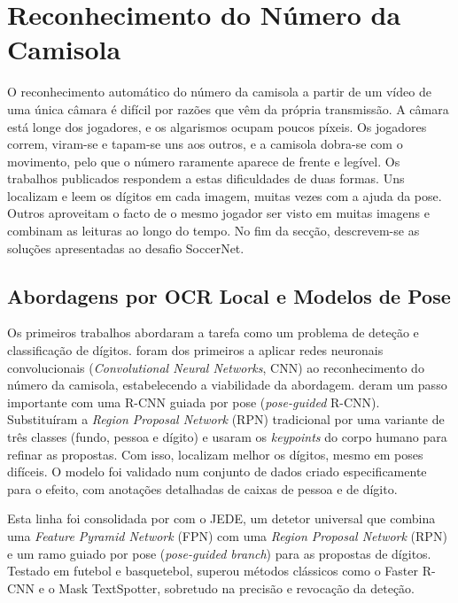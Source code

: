 \section{Reconhecimento do Número da Camisola}

O reconhecimento automático do número da camisola a partir de um vídeo de uma única câmara é difícil por razões que vêm da própria transmissão. A câmara está longe dos jogadores, e os algarismos ocupam poucos píxeis. Os jogadores correm, viram-se e tapam-se uns aos outros, e a camisola dobra-se com o movimento, pelo que o número raramente aparece de frente e legível. Os trabalhos publicados respondem a estas dificuldades de duas formas. Uns localizam e leem os dígitos em cada imagem, muitas vezes com a ajuda da pose. Outros aproveitam o facto de o mesmo jogador ser visto em muitas imagens e combinam as leituras ao longo do tempo. No fim da secção, descrevem-se as soluções apresentadas ao desafio SoccerNet.

\subsection{Abordagens por OCR Local e Modelos de Pose}

Os primeiros trabalhos abordaram a tarefa como um problema de deteção e classificação de dígitos. \citet{gerke2015soccer} foram dos primeiros a aplicar redes neuronais convolucionais (\emph{Convolutional Neural Networks}, CNN) ao reconhecimento do número da camisola, estabelecendo a viabilidade da abordagem. \citet{liu2019poseguided} deram um passo importante com uma R-CNN guiada por pose (\emph{pose-guided} R-CNN). Substituíram a \emph{Region Proposal Network} (RPN) tradicional por uma variante de três classes (fundo, pessoa e dígito) e usaram os \emph{keypoints} do corpo humano para refinar as propostas. Com isso, localizam melhor os dígitos, mesmo em poses difíceis. O modelo foi validado num conjunto de dados criado especificamente para o efeito, com anotações detalhadas de caixas de pessoa e de dígito.

Esta linha foi consolidada por \citet{liu2022jede} com o JEDE, um detetor universal que combina uma \emph{Feature Pyramid Network} (FPN) com uma \emph{Region Proposal Network} (RPN) e um ramo guiado por pose (\emph{pose-guided branch}) para as propostas de dígitos. Testado em futebol e basquetebol, superou métodos clássicos como o Faster R-CNN e o Mask TextSpotter, sobretudo na precisão e revocação da deteção.

